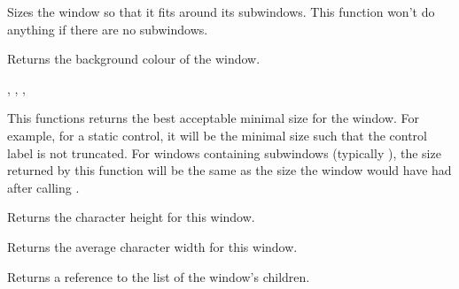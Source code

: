\label{wxwindowfit}


Sizes the window so that it fits around its subwindows. This function won't do
anything if there are no subwindows.

\label{wxwindowgetbackgroundcolour}


Returns the background colour of the window.


,\rtfsp
{},\rtfsp
{},\rtfsp
{}

\label{wxwindowgetbestsize}


This functions returns the best acceptable minimal size for the window. For
example, for a static control, it will be the minimal size such that the
control label is not truncated. For windows containing subwindows (typically
), the size returned by this function will be the
same as the size the window would have had after calling
.



Returns the character height for this window.



Returns the average character width for this window.



Returns a reference to the list of the window's children.

\label{wxwindowgetclientsize}


